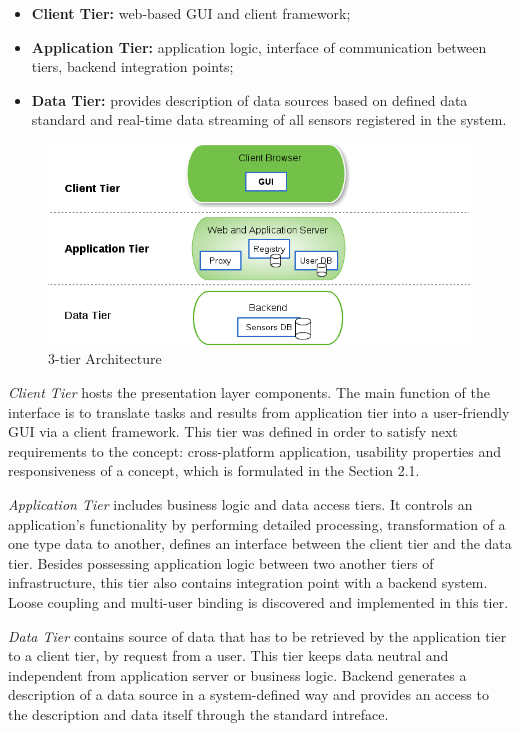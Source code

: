   \begin{itemize}
  \item \textbf{Client Tier:} web-based GUI and client framework;
  \item \textbf{Application Tier:} application logic, interface of communication between tiers, backend integration points;
  \item \textbf{Data Tier:} provides description of data sources based on defined data standard and real-time data streaming of all sensors registered in the system.
  \end{itemize} 

  \begin{figure}[!ht]
  \centering
  \includegraphics[scale=0.7]{images/3tier.png}   
  \caption[3-tier Architecture]{3-tier Architecture}
  \label{img:3-tier Architecture}                           
  \end{figure}

  \emph{Client Tier} hosts the presentation layer components. The main function of the interface is to translate tasks and results from application tier into a user-friendly GUI via a client framework. This tier was defined in order to satisfy next requirements to the concept: cross-platform application, usability properties and responsiveness of a concept, which is formulated in the Section 2.1.

  \emph{Application Tier} includes business logic and data access tiers. It controls an application's functionality by performing detailed processing, transformation of a one type data to another, defines an interface between the client tier and the data tier. Besides possessing application logic between two another tiers of infrastructure, this tier also contains integration point with a backend system. Loose coupling and multi-user binding is discovered and implemented in this tier.

  \emph{Data Tier} contains source of data that has to be retrieved by the application tier to a client tier, by request from a user. This tier keeps data neutral and independent from application server or business logic. Backend generates a description of a data source in a system-defined way and provides an access to the description and data itself through the standard intreface.

